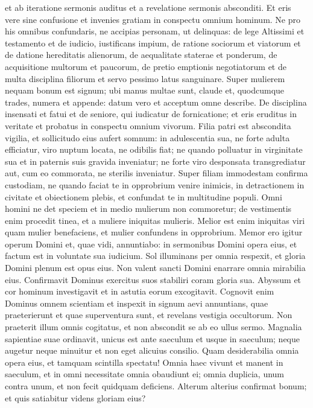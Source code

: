 \begin{biblechapter}  
\verse et ab iteratione sermonis auditus et a revelatione sermonis absconditi. Et eris vere sine confusione et invenies gratiam in conspectu omnium hominum. Ne pro his omnibus confundaris, ne accipias personam, ut delinquas: 
\verse de lege Altissimi et testamento et de iudicio, iustificans impium, 
\verse de ratione sociorum et viatorum et de datione hereditatis alienorum, 
\verse de aequalitate staterae et ponderum, de acquisitione multorum et paucorum, 
\verse de pretio emptionis negotiatorum et de multa disciplina filiorum et servo pessimo latus sanguinare. 
\verse Super mulierem nequam bonum est signum; 
\verse ubi manus multae sunt, claude et, quodcumque trades, numera et appende: datum vero et acceptum omne describe. 
\verse De disciplina insensati et fatui et de seniore, qui iudicatur de fornicatione; et eris eruditus in veritate et probatus in conspectu omnium vivorum. 
\verse Filia patri est abscondita vigilia, et sollicitudo eius aufert somnum: in adulescentia sua, ne forte adulta efficiatur, viro nuptum locata, ne odibilis fiat; 
\verse ne quando polluatur in virginitate sua et in paternis suis gravida inveniatur; ne forte viro desponsata transgrediatur aut, cum eo commorata, ne sterilis inveniatur. 
\verse Super filiam immodestam confirma custodiam, ne quando faciat te in opprobrium venire inimicis, in detractionem in civitate et obiectionem plebis, et confundat te in multitudine populi. 
\verse Omni homini ne det speciem et in medio mulierum non commoretur; 
\verse de vestimentis enim procedit tinea, et a muliere iniquitas mulieris. 
\verse Melior est enim iniquitas viri quam mulier benefaciens, et mulier confundens in opprobrium. 
\verse Memor ero igitur operum Domini et, quae vidi, annuntiabo: in sermonibus Domini opera eius, et factum est in voluntate sua iudicium. 
\verse Sol illuminans per omnia respexit, et gloria Domini plenum est opus eius. 
\verse Non valent sancti Domini enarrare omnia mirabilia eius. Confirmavit Dominus exercitus suos stabiliri coram gloria sua. 
\verse Abyssum et cor hominum investigavit et in astutia eorum excogitavit. 
\verse Cognovit enim Dominus omnem scientiam et inspexit in signum aevi annuntians, quae praeterierunt et quae superventura sunt, et revelans vestigia occultorum. 
\verse Non praeterit illum omnis cogitatus, et non abscondit se ab eo ullus sermo. 
\verse Magnalia sapientiae suae ordinavit, unicus est ante saeculum et usque in saeculum; neque augetur 
\verse neque minuitur et non eget alicuius consilio. 
\verse Quam desiderabilia omnia opera eius, et tamquam scintilla spectatu! 
\verse Omnia haec vivunt et manent in saeculum, et in omni necessitate omnia obaudiunt ei; 
\verse omnia duplicia, unum contra unum, et non fecit quidquam deficiens. 
\verse Alterum alterius confirmat bonum; et quis satiabitur videns gloriam eius? 
\end{biblechapter}


